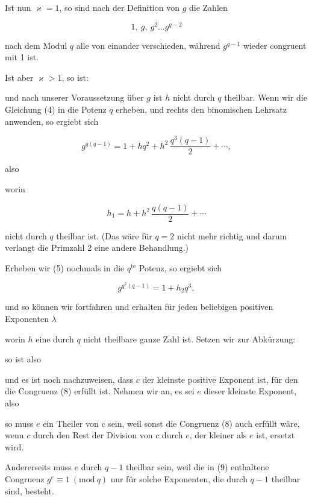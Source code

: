
Ist nun $\varkappa = 1$, so sind nach der Definition von $g$ die Zahlen

\[
1,\ g,\ g^2 \ldots g^{q-2}
\]

nach dem Modul $q$ alle von einander verschieden, während $g^{q-1}$ wieder congruent mit 1 ist.

Ist aber $\varkappa > 1$, so ist:


und nach unserer Voraussetzung über $g$ ist $h$ nicht durch $q$ theilbar. Wenn wir die Gleichung (4) in die Potenz $q$ erheben, und rechts den binomischen Lehrsatz anwenden, so ergiebt sich

\[
g^{q(q-1)} = 1 + hq^2 + h^2\, \frac{q^3(q-1)}{2} + \cdots,
\]

also


worin

\[
h_1 = h + h^2\, \frac{q(q-1)}{2} + \cdots
\]

nicht durch $q$ theilbar ist. (Das wäre für $q = 2$ nicht mehr richtig und darum verlangt die Primzahl 2 eine andere Behandlung.)

Erheben wir (5) nochmals in die $q^{\mathrm{te}}$ Potenz, so ergiebt sich

\[
g^{q^2(q-1)} = 1 + h_2 q^3,
\]

und so können wir fortfahren und erhalten für jeden beliebigen positiven Exponenten $\lambda$


worin $h$ eine durch $q$ nicht theilbare ganze Zahl ist. Setzen wir zur Abkürzung:


so ist also


und es ist noch nachzuweisen, dass $c$ der kleinste positive Exponent ist, für den die Congruenz (8) erfüllt ist. Nehmen wir an, es sei $e$ dieser kleinste Exponent, also


so muss $e$ ein Theiler von $c$ sein, weil sonst die Congruenz (8) auch erfüllt wäre, wenn $c$ durch den Rest der Division von $c$ durch $e$, der kleiner als $e$ ist, ersetzt wird.

Andererseits muss $e$ durch $q-1$ theilbar sein, weil die in (9) enthaltene Congruenz $g^e \equiv 1\ (\mathrm{mod}\ q)$ nur für solche Exponenten, die durch $q-1$ theilbar sind, besteht.
